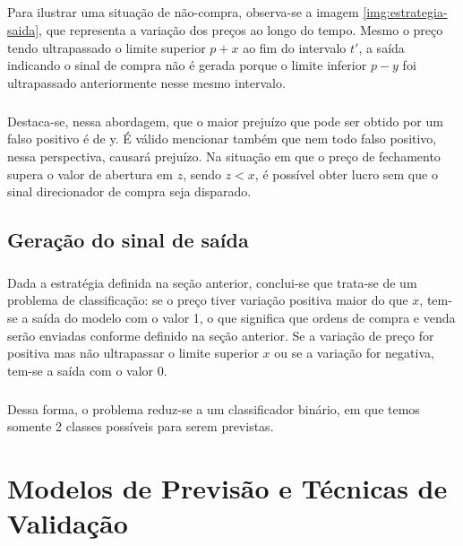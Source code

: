\documentclass[grad,numbers]{coppe}
\begin{document}
            \paragraph{}Para ilustrar uma situação de não-compra, observa-se a imagem \ref{img:estrategia-saida}, que representa a variação dos preços ao longo do tempo. Mesmo o preço tendo ultrapassado o limite superior $p + x$ ao fim do intervalo $t'$, a saída indicando o sinal de compra não é gerada porque o limite inferior $p - y$ foi ultrapassado anteriormente nesse mesmo intervalo.
            
            \paragraph{}Destaca-se, nessa abordagem, que o maior prejuízo que pode ser obtido por um falso positivo é de y. É válido mencionar também que nem todo falso positivo, nessa perspectiva, causará prejuízo. Na situação em que o preço de fechamento supera o valor de abertura em $z$, sendo $z < x$, é possível obter lucro sem que o sinal direcionador de compra seja disparado.
            
        \section{Geração do sinal de saída}
            \paragraph{}Dada a estratégia definida na seção anterior, conclui-se que trata-se de um problema de classificação: se o preço tiver variação positiva maior do que $x$, tem-se a saída do modelo com o valor 1, o que significa que ordens de compra e venda serão enviadas conforme definido na seção anterior. Se a variação de preço for positiva mas não ultrapassar o limite superior $x$ ou se a variação for negativa, tem-se a saída com o valor $0$.
            
            \paragraph{}Dessa forma, o problema reduz-se a um classificador binário, em que temos somente 2 classes possíveis para serem previstas.
            
    \chapter{Modelos de Previsão e Técnicas de Validação}
    
\end{document}
